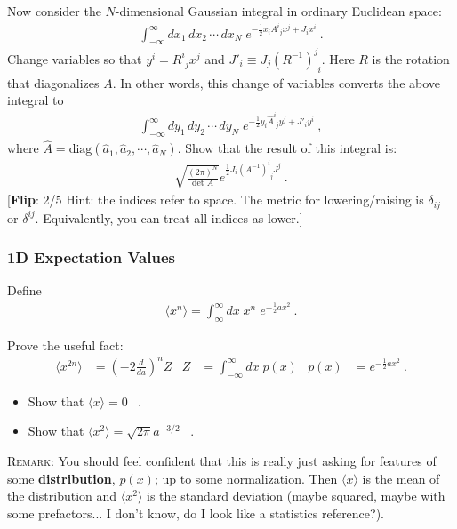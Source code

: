\documentclass[12pt]{article}
\newcommand{\flip}[1]{{\color{red} [\textbf{Flip}: {#1}]}}
\begin{document}
Now consider the $N$-dimensional Gaussian integral in ordinary Euclidean space:
\begin{align}
	\int_{-\infty}^\infty
	dx_1 \, dx_2 \, \cdots \, dx_N \;
	e^{-\frac 12 x_i  A^i_{\phantom{i}j} x^j  + J_i x^i} \ .
\end{align}
Change variables so that $y^i = R^i_{\phantom{i}j}  x^j$ and $J'_i \equiv J_j(R^{-1})^j_{\phantom{j}i}$. Here $R$ is the rotation that diagonalizes $A$. In other words, this change of variables converts the above integral to
\begin{align}
	\int_{-\infty}^\infty
	dy_1 \, dy_2 \, \cdots \, dy_N \;
	e^{-\frac 12 y_i \hat{A}^i_{\phantom{i}j}  y^j  + J'_i y^i} \ ,
\end{align}
where $\hat A = \text{diag}(\hat a_1, \hat a_2, \cdots, \hat a_N)$. Show that the result of this integral is:
\begin{align}
	\sqrt{\frac{(2\pi)^N}{\text{det }A}} e^{\frac 12 J_i (A^{-1})^i_{\phantom{i}j} J^j} \ .
\end{align}
\flip{2/5 Hint: the indices refer to space. The metric for lowering/raising is $\delta_{ij}$ or $\delta^{ij}$. Equivalently, you can treat all indices as lower.}

\subsubsection{1D Expectation Values}

Define
\begin{align}
	\langle x^n \rangle = \int_{\infty}^\infty dx \; x^n \; e^{-\frac 12 ax^2} \ .
\end{align}

Prove the useful fact:
\begin{align}
	\langle x^{2n} \rangle &= \left(-2\frac{d}{da}\right)^n Z
	& 
	Z &= \int_{-\infty}^\infty dx\; p(x) 
	&
	p(x) &=  e^{-\frac 12 ax^2}\ .
\end{align}


\begin{itemize}
	\item Show that $\langle x\rangle = 0$ \ .
	\item Show that $\langle x^2\rangle = \sqrt{2\pi} a^{-3/2}$ \ .
\end{itemize}

\textsc{Remark}: You should feel confident that this is really just asking for features of some \textbf{distribution}, $p(x)$; up to some normalization. Then $\langle x \rangle$ is the mean of the distribution and $\langle x^2 \rangle$ is the standard deviation (maybe squared, maybe with some prefactors... I don't know, do I look like a statistics reference?).  
\end{document}
